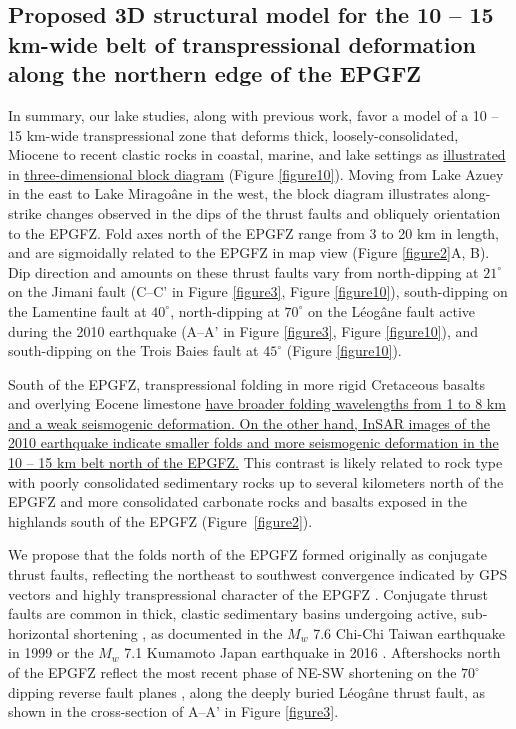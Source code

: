 \documentclass[linenumbers,draft]{agujournal}
\begin{document}
\subsection{Proposed 3D structural model for the 10 -- 15 km-wide belt of transpressional deformation along the northern edge of the EPGFZ}
In summary, our lake studies, along with previous work, favor a model of a 10 -- 15 km-wide transpressional zone that deforms thick, loosely-consolidated, Miocene to recent clastic rocks in coastal, marine, and lake settings as \ul{illustrated} in \ul{three-dimensional block diagram} (Figure \ref{figure10}). Moving from Lake Azuey in the east to Lake Mirago\^ane in the west, the block diagram illustrates along-strike changes observed in the dips of the thrust faults and obliquely orientation to the EPGFZ. Fold axes north of the EPGFZ range from 3 to 20 km in length, and are sigmoidally related to the EPGFZ in map view (Figure \ref{figure2}A, B). Dip direction and amounts on these thrust faults vary from north-dipping at $21^{\circ}$ on the Jimani fault (C--C' in Figure \ref{figure3}, Figure \ref{figure10}), south-dipping on the Lamentine fault \citep{saint2015seismotectonics} at $40^{\circ}$, north-dipping at $70^{\circ}$ on the L\'eog\^ane fault active during the 2010 earthquake (A--A' in Figure \ref{figure3}, Figure \ref{figure10}), and south-dipping on the Trois Baies fault at $45^{\circ}$ (Figure \ref{figure10}). 

South of the EPGFZ, transpressional folding in more rigid Cretaceous basalts and overlying Eocene limestone \ul{have broader folding wavelengths from 1 to 8 km and a weak seismogenic deformation. On the other hand, InSAR images of the 2010 earthquake indicate smaller folds and more seismogenic deformation in the 10 -- 15 km belt north of the EPGFZ.} This contrast is likely related to rock type with poorly consolidated sedimentary rocks up to several kilometers north of the EPGFZ and more consolidated carbonate rocks and basalts exposed in the highlands south of the EPGFZ \underline{\citep{mann1991overview}} (Figure~\ref{figure2}).

We propose that the folds north of the EPGFZ formed originally as conjugate thrust faults, reflecting the northeast to southwest convergence indicated by GPS vectors and highly transpressional character of the EPGFZ \citep{calais2010transpressional}. Conjugate thrust faults are common in thick, clastic sedimentary basins undergoing active, sub-horizontal shortening \citep{sibson2012reverse}, as documented in the $M_w$ 7.6 Chi-Chi Taiwan earthquake in 1999 \citep{chen2002conjugate} or the $M_w$ 7.1 Kumamoto Japan earthquake in 2016 \citep{lin2017coseismic}. Aftershocks north of the EPGFZ reflect the most recent phase of NE-SW shortening on the $70^{\circ}$ dipping reverse fault planes \citep{nettles2010earthquake}, along the deeply buried L\'eog\^ane thrust fault, as shown in the cross-section of A--A' in Figure \ref{figure3}.
\end{document}
